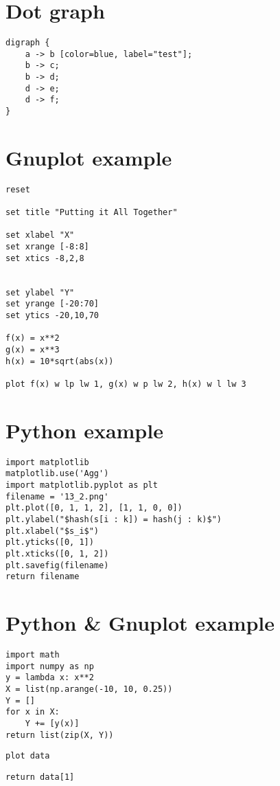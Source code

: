 \documentclass[english]{article}
\theoremstyle{plain}
\theoremstyle{remark}
\theoremstyle{definition}
\begin{document}
\section{Dot graph}
\label{sec:org3aeb960}
\begin{verbatim}
digraph {
    a -> b [color=blue, label="test"];
    b -> c;
    b -> d;
    d -> e;
    d -> f;
}
\end{verbatim}
\section{Gnuplot example}
\label{sec:org411bb36}

\begin{verbatim}
reset

set title "Putting it All Together"

set xlabel "X"
set xrange [-8:8]
set xtics -8,2,8


set ylabel "Y"
set yrange [-20:70]
set ytics -20,10,70

f(x) = x**2
g(x) = x**3
h(x) = 10*sqrt(abs(x))

plot f(x) w lp lw 1, g(x) w p lw 2, h(x) w l lw 3
\end{verbatim}
\section{Python example}
\label{sec:orgf859d7e}

\begin{verbatim}
import matplotlib
matplotlib.use('Agg')
import matplotlib.pyplot as plt
filename = '13_2.png'
plt.plot([0, 1, 1, 2], [1, 1, 0, 0])
plt.ylabel("$hash(s[i : k]) = hash(j : k)$")
plt.xlabel("$s_i$")
plt.yticks([0, 1])
plt.xticks([0, 1, 2])
plt.savefig(filename)
return filename
\end{verbatim}
\section{Python \& Gnuplot example}
\label{sec:org040dd5d}

\begin{verbatim}
import math
import numpy as np
y = lambda x: x**2
X = list(np.arange(-10, 10, 0.25))
Y = []
for x in X:
    Y += [y(x)]
return list(zip(X, Y))
\end{verbatim}

\begin{verbatim}
plot data
\end{verbatim}

\begin{verbatim}
return data[1]
\end{verbatim}
\end{document}
